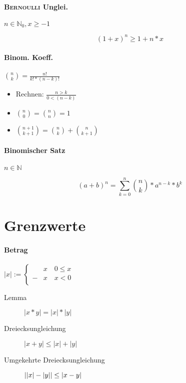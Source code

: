 \paragraph{\textsc{Bernoulli} Unglei.} $n \in \mathbb{N}_0, x \geq -1$

$$(1 + x)^n \geq 1 + n * x$$

\paragraph{Binom. Koeff.} $\binom{n}{k} = \frac{n!}{k! * (n - k)!}$

\begin{itemize}
      \item Rechnen: $\frac{n > k}{0 < (n - k)}$

      \item $\binom{n}{0} = \binom{n}{n} = 1$

      \item $\binom{n + 1}{k + 1} = \binom{n}{k} + \binom{n}{k + 1}$
\end{itemize}

\paragraph{Binomischer Satz} $n \in \mathbb{N}$

$$(a + b)^n = \sum_{k=0}^n \binom{n}{k} * a^{n - k} * b^k$$

\section{Grenzwerte}

\paragraph{Betrag} $|x| := \begin{cases}
              & x \quad 0 \leq x \\
            - & x \quad x < 0    \\
      \end{cases}$

\begin{description}
      \item [Lemma] $|x * y| = |x| * |y|$

      \item [Dreiecksungleichung]
            $|x + y| \boldsymbol{\leq} |x| + |y|$

      \item [Umgekehrte \linebreak Dreiecksungleichung]
            $\linebreak ||x| - |y|| \leq |x - y|$
\end{description}

